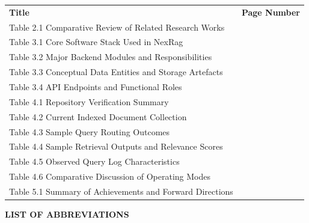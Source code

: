 \noindent
\begin{tabularx}{\textwidth}{>{\RaggedRight\arraybackslash}X r}
            \textbf{Title} & \textbf{Page Number} \\[0.6cm]
            
            Table 2.1 Comparative Review of Related Research Works & \pageref{tab:literature-comparison} \\[0.3cm]
            Table 3.1 Core Software Stack Used in NexRag & \pageref{tab:software-stack} \\[0.3cm]
            Table 3.2 Major Backend Modules and Responsibilities & \pageref{tab:backend-modules} \\[0.3cm]
            Table 3.3 Conceptual Data Entities and Storage Artefacts & \pageref{tab:data-entities} \\[0.3cm]
            Table 3.4 API Endpoints and Functional Roles & \pageref{tab:api-endpoints} \\[0.3cm]
            Table 4.1 Repository Verification Summary & \pageref{tab:repository-verification} \\[0.3cm]
            Table 4.2 Current Indexed Document Collection & \pageref{tab:indexed-document-collection} \\[0.3cm]
            Table 4.3 Sample Query Routing Outcomes & \pageref{tab:routing-outcomes} \\[0.3cm]
            Table 4.4 Sample Retrieval Outputs and Relevance Scores & \pageref{tab:retrieval-outputs} \\[0.3cm]
            Table 4.5 Observed Query Log Characteristics & \pageref{tab:query-log-characteristics} \\[0.3cm]
            Table 4.6 Comparative Discussion of Operating Modes & \pageref{tab:operating-modes} \\[0.3cm]
            Table 5.1 Summary of Achievements and Forward Directions & \pageref{tab:conclusion-summary} \\[0.3cm]
            
\end{tabularx}

\newpage
 
\begin{center}
    

 {\fontsize{14}{16}\selectfont \textbf{LIST OF ABBREVIATIONS}}
 \end{center}
\label{front:abbreviations}
\vspace{1cm}

